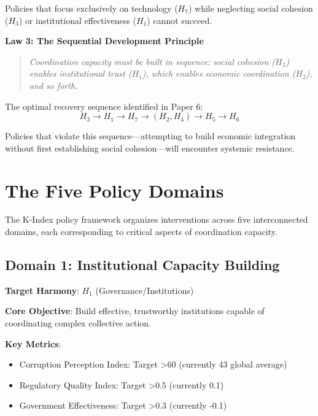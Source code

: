 \documentclass[12pt,letterpaper]{article}
\begin{document}
Policies that focus exclusively on technology ($H_7$) while neglecting social cohesion ($H_3$) or institutional effectiveness ($H_1$) cannot succeed.

\textbf{Law 3: The Sequential Development Principle}
\begin{quote}
\textit{Coordination capacity must be built in sequence: social cohesion ($H_3$) enables institutional trust ($H_1$), which enables economic coordination ($H_2$), and so forth.}
\end{quote}

The optimal recovery sequence identified in Paper 6:
\begin{equation}
H_3 \rightarrow H_1 \rightarrow H_7 \rightarrow (H_2, H_4) \rightarrow H_5 \rightarrow H_6
\end{equation}

Policies that violate this sequence---attempting to build economic integration without first establishing social cohesion---will encounter systemic resistance.

\section{The Five Policy Domains}

The K-Index policy framework organizes interventions across five interconnected domains, each corresponding to critical aspects of coordination capacity.

\subsection{Domain 1: Institutional Capacity Building}

\textbf{Target Harmony}: $H_1$ (Governance/Institutions)

\textbf{Core Objective}: Build effective, trustworthy institutions capable of coordinating complex collective action.

\textbf{Key Metrics}:
\begin{itemize}
    \item Corruption Perception Index: Target >60 (currently 43 global average)
    \item Regulatory Quality Index: Target >0.5 (currently 0.1)
    \item Government Effectiveness: Target >0.3 (currently -0.1)
\end{itemize}
\end{document}
